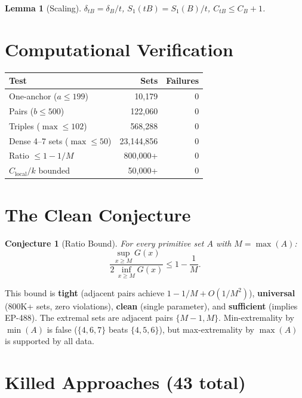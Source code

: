 \documentclass[11pt,a4paper]{article}
\newtheorem{lemma}[theorem]{Lemma}
\newtheorem{conjecture}[theorem]{Conjecture}
\theoremstyle{definition}
\begin{document}
\begin{lemma}[Scaling]\label{lem:scaling}
$\delta_{tB} = \delta_B/t$, \quad $S_1(tB) = S_1(B)/t$, \quad
$C_{tB} \leq C_B + 1$.
\end{lemma}

\section{Computational Verification}

\begin{center}
\begin{tabular}{lrr}
\toprule
\textbf{Test} & \textbf{Sets} & \textbf{Failures} \\
\midrule
One-anchor ($a \leq 199$) & 10,179 & 0 \\
Pairs ($b \leq 500$) & 122,060 & 0 \\
Triples ($\max \leq 102$) & 568,288 & 0 \\
Dense 4--7 sets ($\max \leq 50$) & 23,144,856 & 0 \\
Ratio $\leq 1{-}1/M$ & 800,000+ & 0 \\
$C_{\mathrm{local}}/k$ bounded & 50,000+ & 0 \\
\bottomrule
\end{tabular}
\end{center}

\section{The Clean Conjecture}

\begin{conjecture}[Ratio Bound]\label{conj:ratio}
For every primitive set $A$ with $M = \max(A)$:
\[
\frac{\sup_{x \geq M} G(x)}{2\,\inf_{x \geq M} G(x)}
\leq 1 - \frac{1}{M}.
\]
\end{conjecture}

This bound is \textbf{tight} (adjacent pairs achieve
$1 - 1/M + O(1/M^2)$), \textbf{universal} (800K+ sets, zero
violations), \textbf{clean} (single parameter), and \textbf{sufficient}
(implies EP-488). The extremal sets are adjacent pairs $\{M{-}1, M\}$.
Min-extremality by $\min(A)$ is false ($\{4,6,7\}$ beats $\{4,5,6\}$),
but max-extremality by $\max(A)$ is supported by all data.

\section{Killed Approaches (43 total)}
\end{document}
